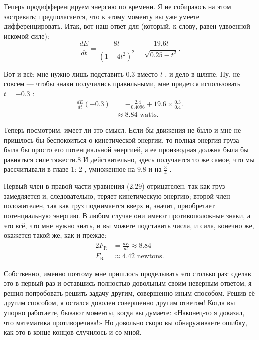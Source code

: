 \documentclass[11pt,oneside]{article}
\providecommand{\ddt}[2]{\frac{d#1}{d#2}}
\begin{document}
Теперь продифференцируем энергию по времени. Я не собираюсь на этом застревать; предполагается, что к этому моменту вы уже умеете дифференцировать. Итак, вот наш ответ для (который, к слову, равен удвоенной искомой силе): 
\begin{equation*} \tag{2.28}
\label{Eq:TIPS:2:28} \ddt{E}{t} = \frac{8t}{(1-4t^2)^2} - \frac{19.6t}{\sqrt{0.25-t^2}}. \end{equation*}
\par

Вот и всё; мне нужно лишь подставить \(0.3\) вместо \(t\) , и дело в шляпе. Ну, не совсем --- чтобы знаки получились правильными, мне придется использовать \(t = -0.3\) : 
\begin{equation*} \begin{aligned} \ddt{E}{t}(-0.3) &= -\frac{2.4}{0.4096}\!+ 19.6 \times\!\frac{0.3}{0.4}.\\[1ex] &\approx 8.84 \text{ watts}. \end{aligned} \tag{2.29}
\label{Eq:TIPS:2:29} \end{equation*}
\par

Теперь посмотрим, имеет ли это смысл. Если бы движения не было и мне не пришлось бы беспокоиться о кинетической энергии, то полная энергия груза была бы просто его потенциальной энергией, а ее производная должна была бы равняться силе тяжести.8 И действительно, здесь получается то же самое, что мы рассчитывали в главе 1: \(2\) , умноженное на \(9.8\) и на \(\frac{3}{4}\) .\par

Первый член в правой части уравнения (2.29) отрицателен, так как груз замедляется и, следовательно, теряет кинетическую энергию; второй член положителен, так как груз поднимается вверх и, значит, приобретает потенциальную энергию. В любом случае они имеют противоположные знаки, а это всё, что мне нужно знать, и вы можете подставить числа, и сила, конечно же, окажется такой же, как и прежде: 
\begin{equation*} \begin{aligned} 2F_\text{R} &= \ddt{E}{t} \approx 8.84\\[1ex] F_\text{R} &\approx 4.42 \text{ newtons}. \end{aligned} \tag{2.30}
\label{Eq:TIPS:2:30} \end{equation*}
\par

Собственно, именно поэтому мне пришлось проделывать это столько раз: сделав это в первый раз и оставшись полностью довольным своим неверным ответом, я решил попробовать решить задачу другим, совершенно иным способом. Решив её другим способом, я остался доволен совершенно другим ответом! Когда вы упорно работаете, бывают моменты, когда вы думаете: «Наконец-то я доказал, что математика противоречива!» Но довольно скоро вы обнаруживаете ошибку, как это в конце концов случилось и со мной.\par
\end{document}

